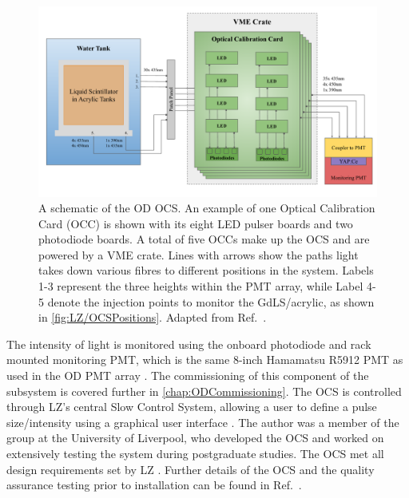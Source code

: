 \begin{figure}[!ht]
    \centering
    \includegraphics[width=0.9\linewidth]{figures/LZ/OCSSchematics.pdf}
    \caption{A schematic of the OD OCS. An example of one Optical Calibration Card (OCC) is shown with its eight LED pulser boards and two photodiode boards. A total of five OCCs make up the OCS and are powered by a VME crate. Lines with arrows show the paths light takes down various fibres to different positions in the system. Labels 1-3 represent the three heights within the PMT array, while Label 4-5 denote the injection points to monitor the GdLS/acrylic, as shown in \autoref{fig:LZ/OCSPositions}. Adapted from Ref.~\cite{Turner:2021qvi,LZ:2024bsz}.}
    \label{fig:LZ/OCSSchematic}
\end{figure}
The intensity of light is monitored using the onboard photodiode and rack mounted monitoring PMT, which is the same 8-inch Hamamatsu R5912 PMT as used in the OD PMT array \cite{Turner:2021qvi}. The commissioning of this component of the subsystem is covered further in \autoref{chap:ODCommissioning}. The OCS is controlled through LZ's central Slow Control System, allowing a user to define a pulse size/intensity using a graphical user interface \cite{hbirch:thesis}.
The author was a member of the group at the University of Liverpool, who developed the OCS and worked on extensively testing the system during postgraduate studies. The OCS met all design requirements set by LZ \cite{Turner:2021qvi}. Further details of the OCS and the quality assurance testing prior to installation can be found in Ref.~\cite{hbirch:thesis,Turner:2021qvi}.

